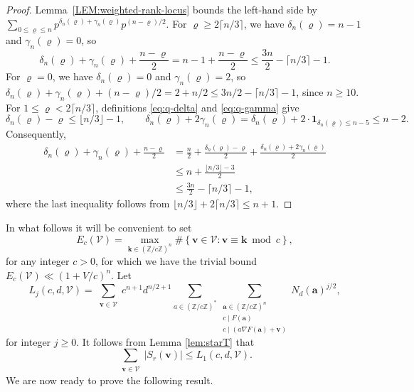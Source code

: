 \documentclass[a4paper,11pt, twoside,reqno]{amsart}
\theoremstyle{plain}
\theoremstyle{definition}
\theoremstyle{remark}
\newcommand{\bfv}{\bm{v}}
\newcommand{\ZZ}{\mathbb{Z}}
\renewcommand{\le}{\leqslant}
\renewcommand{\leq}{\leqslant}
\renewcommand{\ge}{\geqslant}
\renewcommand{\geq}{\geqslant}
\numberwithin{equation}{section}
\begin{document}
\begin{proof}
Lemma~\ref{LEM:weighted-rank-locus} bounds the left-hand side by
$\sum_{0\le \varrho\le n} p^{\delta_n(\varrho) + \gamma_n(\varrho)} p^{(n-\varrho)/2}$.
For $\varrho\ge 2\lceil n/3\rceil$,
we have $\delta_n(\varrho) = n-1$ and $\gamma_n(\varrho) = 0$, so
\begin{equation*}
\delta_n(\varrho)+\gamma_n(\varrho)
+\frac{n-\varrho}{2}
= n-1 + \frac{n-\varrho}{2}
\le \frac{3n}{2}-\lceil n/3\rceil-1.
\end{equation*}
For $\varrho=0$, we have $\delta_n(\varrho)=0$ and $\gamma_n(\varrho)=2$,
so $\delta_n(\varrho)+\gamma_n(\varrho) + (n-\varrho)/2
= 2 + n/2 \le 3n/2 - \lceil n/3\rceil - 1$,
since $n\ge 10$.
For $1\le\varrho<2\lceil n/3\rceil$, definitions
\eqref{eq:q-delta} and \eqref{eq:q-gamma} give
\[
\delta_n(\varrho)-\varrho\le \lfloor n/3\rfloor - 1,
\qquad
\delta_n(\varrho)+2\gamma_n(\varrho)
= \delta_n(\varrho) + 2\cdot \bm{1}_{\delta_n(\varrho)\le n-5} \le n-2.
\]
Consequently,
\[
\begin{aligned}
\delta_n(\varrho)+\gamma_n(\varrho)+\frac{n-\varrho}{2}
&=\frac n2+
\frac{\delta_n(\varrho)-\varrho}{2}
+\frac{\delta_n(\varrho)+2\gamma_n(\varrho)}{2}\\
&\leq n+\frac{\lfloor n/3\rfloor-3}{2}\\
&\leq\frac{3n}{2}-\lceil n/3\rceil-1,
\end{aligned}
\]
where the last inequality follows from
$\lfloor n/3\rfloor+2\lceil n/3\rceil\leq n+1$.
\end{proof}






In what follows it will be convenient to set
\begin{equation}\label{eq:Nc-V}
E_c(\mathcal{V})=\max_{\bm{k}\in (\ZZ/c\ZZ)^n} 
\#\left\{\bfv\in \mathcal{V}: \bm{v}\equiv \bm{k} \bmod{c}\right\},
\end{equation}
for any integer $c>0$, 
for which we have the trivial bound $E_c(\mathcal{V})\ll (1+V/c)^n.$ 
Let 
\begin{equation}\label{Eq: Defi.Lc,d,V}
L_j(c,d,\mathcal{V}) = 		\sum_{\substack{\bfv\in \mathcal{V}}}
c^{n+1}d^{n/2+1}
\sum_{a\in (\ZZ/c\ZZ)^*} \sum_{
\substack{\bm{a}\in (\ZZ/c\ZZ)^n\\ 
c\mid F(\bm{a})\\
c\mid (a\nabla F(\bm{a})+\bm{v})}} N_d(\bm{a})^{j/2},
\end{equation}
for integer $j\geq 0$. It follows from Lemma \ref{lem:starT} that
\begin{equation}\label{eq:from-lemstar}
\sum_{\substack{\bfv\in \mathcal{V}}} |S_{r}(\bm{v})|\leq L_1(c,d,\mathcal{V}).
\end{equation}
We are now ready to prove
the following result. 
	
\end{document}
